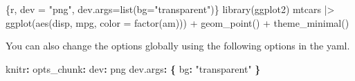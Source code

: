 \documentclass[
  letterpaper,
  DIV=11,
  numbers=noendperiod]{scrreprt}
\newenvironment{Shaded}{\begin{snugshade}}{\end{snugshade}}
\newcommand{\AttributeTok}[1]{\textcolor[rgb]{0.40,0.45,0.13}{#1}}
\newcommand{\FunctionTok}[1]{\textcolor[rgb]{0.28,0.35,0.67}{#1}}
\newcommand{\InformationTok}[1]{\textcolor[rgb]{0.37,0.37,0.37}{#1}}
\newcommand{\KeywordTok}[1]{\textcolor[rgb]{0.00,0.23,0.31}{\textbf{#1}}}
\newcommand{\StringTok}[1]{\textcolor[rgb]{0.13,0.47,0.30}{#1}}
\begin{document}
\begin{Shaded}
\begin{Highlighting}[]
\InformationTok{\textasciigrave{}\textasciigrave{}\textasciigrave{}\{r, dev = "png", dev.args=list(bg="transparent")\}}
\InformationTok{library(ggplot2)}
\InformationTok{mtcars |\textgreater{}}
\InformationTok{  ggplot(aes(disp, mpg, color = factor(am))) +}
\InformationTok{  geom\_point() +}
\InformationTok{  theme\_minimal()}
\InformationTok{\textasciigrave{}\textasciigrave{}\textasciigrave{}}
\end{Highlighting}
\end{Shaded}

You can also change the options globally using the following options in
the yaml.

\begin{Shaded}
\begin{Highlighting}[]
\FunctionTok{knitr}\KeywordTok{:}
\AttributeTok{  }\FunctionTok{opts\_chunk}\KeywordTok{:}
\AttributeTok{    }\FunctionTok{dev}\KeywordTok{:}\AttributeTok{ png}
\AttributeTok{    }\FunctionTok{dev.args}\KeywordTok{:}\AttributeTok{ }\KeywordTok{\{}\AttributeTok{ }\FunctionTok{bg}\KeywordTok{:}\AttributeTok{ }\StringTok{"transparent"}\AttributeTok{ }\KeywordTok{\}}
\end{Highlighting}
\end{Shaded}
\end{document}
